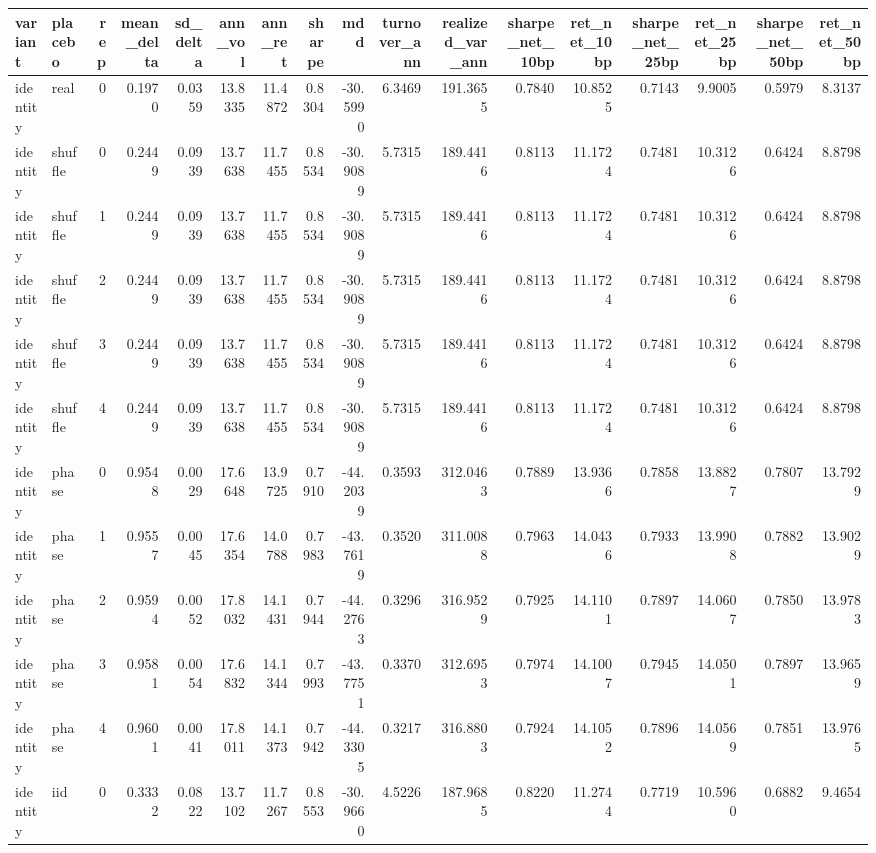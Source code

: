 \begin{tabular}{llrrrrrrrrrrrrrrr}
\toprule
variant & placebo & rep & mean_delta & sd_delta & ann_vol & ann_ret & sharpe & mdd & turnover_ann & realized_var_ann & sharpe_net_10bp & ret_net_10bp & sharpe_net_25bp & ret_net_25bp & sharpe_net_50bp & ret_net_50bp \\
\midrule
identity & real & 0 & 0.1970 & 0.0359 & 13.8335 & 11.4872 & 0.8304 & -30.5990 & 6.3469 & 191.3655 & 0.7840 & 10.8525 & 0.7143 & 9.9005 & 0.5979 & 8.3137 \\
identity & shuffle & 0 & 0.2449 & 0.0939 & 13.7638 & 11.7455 & 0.8534 & -30.9089 & 5.7315 & 189.4416 & 0.8113 & 11.1724 & 0.7481 & 10.3126 & 0.6424 & 8.8798 \\
identity & shuffle & 1 & 0.2449 & 0.0939 & 13.7638 & 11.7455 & 0.8534 & -30.9089 & 5.7315 & 189.4416 & 0.8113 & 11.1724 & 0.7481 & 10.3126 & 0.6424 & 8.8798 \\
identity & shuffle & 2 & 0.2449 & 0.0939 & 13.7638 & 11.7455 & 0.8534 & -30.9089 & 5.7315 & 189.4416 & 0.8113 & 11.1724 & 0.7481 & 10.3126 & 0.6424 & 8.8798 \\
identity & shuffle & 3 & 0.2449 & 0.0939 & 13.7638 & 11.7455 & 0.8534 & -30.9089 & 5.7315 & 189.4416 & 0.8113 & 11.1724 & 0.7481 & 10.3126 & 0.6424 & 8.8798 \\
identity & shuffle & 4 & 0.2449 & 0.0939 & 13.7638 & 11.7455 & 0.8534 & -30.9089 & 5.7315 & 189.4416 & 0.8113 & 11.1724 & 0.7481 & 10.3126 & 0.6424 & 8.8798 \\
identity & phase & 0 & 0.9548 & 0.0029 & 17.6648 & 13.9725 & 0.7910 & -44.2039 & 0.3593 & 312.0463 & 0.7889 & 13.9366 & 0.7858 & 13.8827 & 0.7807 & 13.7929 \\
identity & phase & 1 & 0.9557 & 0.0045 & 17.6354 & 14.0788 & 0.7983 & -43.7619 & 0.3520 & 311.0088 & 0.7963 & 14.0436 & 0.7933 & 13.9908 & 0.7882 & 13.9029 \\
identity & phase & 2 & 0.9594 & 0.0052 & 17.8032 & 14.1431 & 0.7944 & -44.2763 & 0.3296 & 316.9529 & 0.7925 & 14.1101 & 0.7897 & 14.0607 & 0.7850 & 13.9783 \\
identity & phase & 3 & 0.9581 & 0.0054 & 17.6832 & 14.1344 & 0.7993 & -43.7751 & 0.3370 & 312.6953 & 0.7974 & 14.1007 & 0.7945 & 14.0501 & 0.7897 & 13.9659 \\
identity & phase & 4 & 0.9601 & 0.0041 & 17.8011 & 14.1373 & 0.7942 & -44.3305 & 0.3217 & 316.8803 & 0.7924 & 14.1052 & 0.7896 & 14.0569 & 0.7851 & 13.9765 \\
identity & iid & 0 & 0.3332 & 0.0822 & 13.7102 & 11.7267 & 0.8553 & -30.9660 & 4.5226 & 187.9685 & 0.8220 & 11.2744 & 0.7719 & 10.5960 & 0.6882 & 9.4654 \\

\end{tabular}

